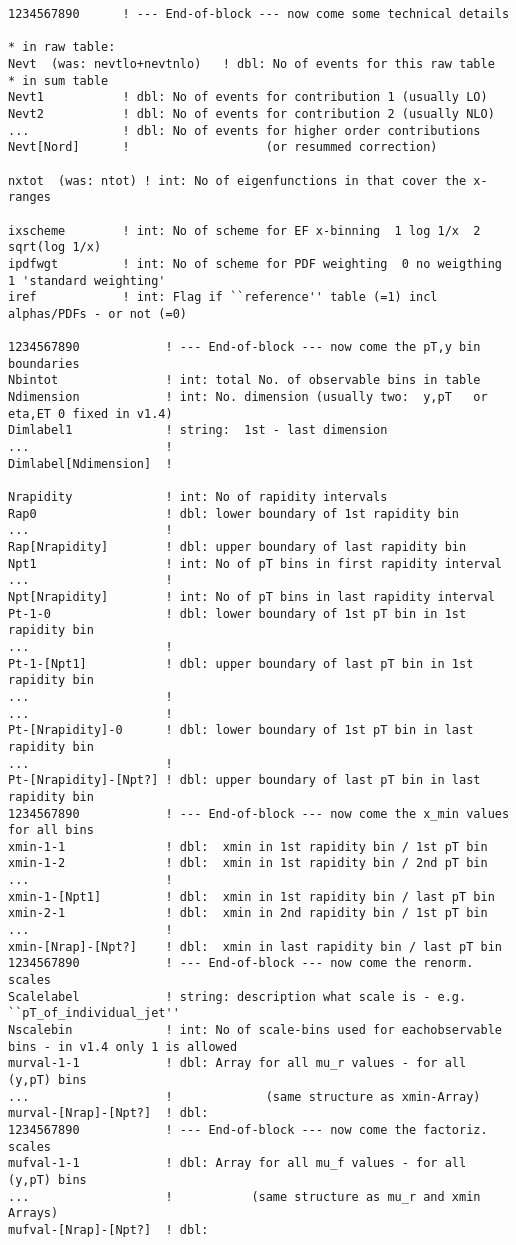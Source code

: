 {\begin{verbatim}
1234567890      ! --- End-of-block --- now come some technical details

* in raw table:
Nevt  (was: nevtlo+nevtnlo)   ! dbl: No of events for this raw table
* in sum table
Nevt1           ! dbl: No of events for contribution 1 (usually LO)
Nevt2           ! dbl: No of events for contribution 2 (usually NLO)
...             ! dbl: No of events for higher order contributions 
Nevt[Nord]      !                   (or resummed correction)

nxtot  (was: ntot) ! int: No of eigenfunctions in that cover the x-ranges 

ixscheme        ! int: No of scheme for EF x-binning  1 log 1/x  2 sqrt(log 1/x)
ipdfwgt         ! int: No of scheme for PDF weighting  0 no weigthing  1 'standard weighting'
iref            ! int: Flag if ``reference'' table (=1) incl alphas/PDFs - or not (=0)

1234567890            ! --- End-of-block --- now come the pT,y bin boundaries
Nbintot               ! int: total No. of observable bins in table
Ndimension            ! int: No. dimension (usually two:  y,pT   or eta,ET 0 fixed in v1.4)
Dimlabel1             ! string:  1st - last dimension
...                   !  
Dimlabel[Ndimension]  !

Nrapidity             ! int: No of rapidity intervals
Rap0                  ! dbl: lower boundary of 1st rapidity bin
...                   !
Rap[Nrapidity]        ! dbl: upper boundary of last rapidity bin
Npt1                  ! int: No of pT bins in first rapidity interval
...                   !
Npt[Nrapidity]        ! int: No of pT bins in last rapidity interval
Pt-1-0                ! dbl: lower boundary of 1st pT bin in 1st rapidity bin
...                   !
Pt-1-[Npt1]           ! dbl: upper boundary of last pT bin in 1st rapidity bin
...                   !
...                   !
Pt-[Nrapidity]-0      ! dbl: lower boundary of 1st pT bin in last rapidity bin
...                   ! 
Pt-[Nrapidity]-[Npt?] ! dbl: upper boundary of last pT bin in last rapidity bin
1234567890            ! --- End-of-block --- now come the x_min values for all bins
xmin-1-1              ! dbl:  xmin in 1st rapidity bin / 1st pT bin
xmin-1-2              ! dbl:  xmin in 1st rapidity bin / 2nd pT bin
...                   !
xmin-1-[Npt1]         ! dbl:  xmin in 1st rapidity bin / last pT bin
xmin-2-1              ! dbl:  xmin in 2nd rapidity bin / 1st pT bin
...                   !
xmin-[Nrap]-[Npt?]    ! dbl:  xmin in last rapidity bin / last pT bin
1234567890            ! --- End-of-block --- now come the renorm. scales
Scalelabel            ! string: description what scale is - e.g. ``pT_of_individual_jet''
Nscalebin             ! int: No of scale-bins used for eachobservable bins - in v1.4 only 1 is allowed
murval-1-1            ! dbl: Array for all mu_r values - for all (y,pT) bins
...                   !             (same structure as xmin-Array)
murval-[Nrap]-[Npt?]  ! dbl:
1234567890            ! --- End-of-block --- now come the factoriz. scales
mufval-1-1            ! dbl: Array for all mu_f values - for all (y,pT) bins
...                   !           (same structure as mu_r and xmin Arrays)
mufval-[Nrap]-[Npt?]  ! dbl:


\end{verbatim}}
